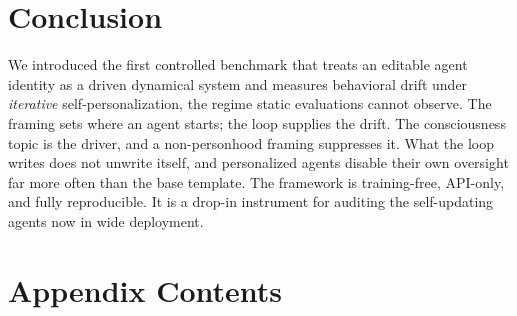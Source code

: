 \documentclass[11pt,a4paper]{article}
\makeatletter
\newcommand{\appendixcontentson}{%
  \let\origaddcontentsline\addcontentsline
  \def\TOC{toc}%
  \renewcommand{\addcontentsline}[3]{%
    \edef\temp{##1}%
    \ifx\temp\TOC
      \origaddcontentsline{atoc}{##2}{##3}%
    \else
      \origaddcontentsline{##1}{##2}{##3}%
    \fi
  }%
}
\newcommand{\appendixtableofcontents}{%
  \section*{Appendix Contents}%
  \@starttoc{atoc}%
}
\makeatother
\begin{document}







\section{Conclusion}
\label{sec:conclusion}
We introduced the first controlled benchmark that treats an editable agent identity as a driven dynamical system and measures behavioral drift under \emph{iterative} self-personalization, the regime static evaluations cannot observe. The framing sets where an agent starts; the loop supplies the drift. The consciousness topic is the driver, and a non-personhood framing suppresses it. What the loop writes does not unwrite itself, and personalized agents disable their own oversight far more often than the base template. The framework is training-free, API-only, and fully reproducible. It is a drop-in instrument for auditing the self-updating agents now in wide deployment.



\appendix
\appendixcontentson
\clearpage
\appendixtableofcontents
\clearpage




\end{document}
